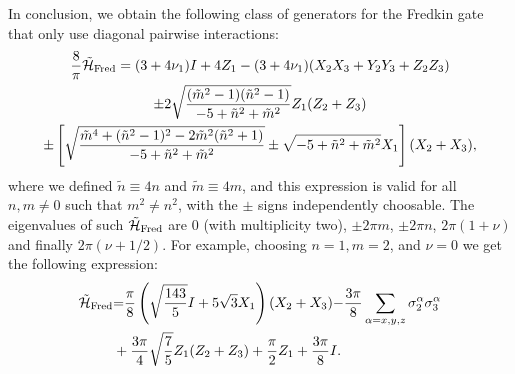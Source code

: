 In conclusion, we obtain the following class of generators for the Fredkin gate that only use diagonal pairwise interactions:
\begin{equation}
\begin{gathered}
    \frac{8}{\pi}\tilde{{\mathcal{H}}}_{\operatorname{Fred}} =
    (3 + 4\nu_1) I + 4 Z_1
    - (3 + 4\nu_1) (X_2 X_3 + Y_2 Y_3 + Z_2 Z_3) \\
    \pm 2 \sqrt{\frac{
        (\tilde m^2-1)(\tilde n^2-1)
    }{
        -5 + \tilde n^2 + \tilde m^2
    }} Z_1 ( Z_2 + Z_3) \\
    \pm \left[
    \sqrt{\frac{
        \tilde m^4 + (\tilde n^2-1)^2 - 2 \tilde m^2(\tilde n^2+1)
    }{
        -5 + \tilde n^2 + \tilde m^2
    }}
    \pm \sqrt{-5 + \tilde n^2 + \tilde m^2} X_1
    \right] (X_2 + X_3),
\end{gathered}
\end{equation}
where we defined $\tilde n\equiv 4n$ and $\tilde m\equiv 4m$, and this expression is valid for all $n,m\neq0$ such that $m^2\neq n^2$, with the $\pm$ signs independently choosable.
The eigenvalues of such $\tilde{{\mathcal{H}}}_{\operatorname{Fred}}$ are $0$ (with multiplicity two), $\pm 2\pi m$, $\pm2\pi n$, $2\pi(1+\nu)$ and finally $2\pi(\nu+1/2)$.  
For example, choosing $n=1, m=2$, and $\nu=0$ we get the following expression:
\begin{align}
    \tilde{{\mathcal{H}}}_{\operatorname{Fred}} &{=} 
    \frac{\pi}{8} \left( \sqrt{\frac{143}{5}}I+5\sqrt 3 X_1\right)(X_2 + X_3) {-}\frac{3\pi}{8} \sum_{\alpha=x,y,z}\sigma^\alpha_2 \sigma^\alpha_3
    \nonumber\\
    &+
    \frac{3\pi}{4}\sqrt{\frac{7}{5}}Z_1(Z_2+Z_3) +\frac{\pi}{2}Z_1+\frac{3\pi}{8}I.
    \label{eq:GL:fredkin_generator}
\end{align}

